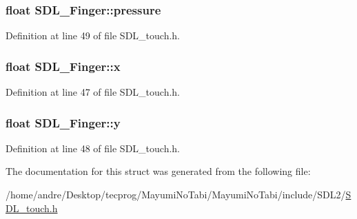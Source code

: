 \hypertarget{struct_s_d_l___finger_a0ecb50c7fd699d59899ac60c941bdee6}{
\subsubsection[{pressure}]{\setlength{\rightskip}{0pt plus 5cm}float S\-D\-L\-\_\-\-Finger\-::pressure}}\label{struct_s_d_l___finger_a0ecb50c7fd699d59899ac60c941bdee6}


Definition at line 49 of file S\-D\-L\-\_\-touch.\-h.

\hypertarget{struct_s_d_l___finger_ab91dfbd03c3215560457fef44e1c7755}{
\subsubsection[{x}]{\setlength{\rightskip}{0pt plus 5cm}float S\-D\-L\-\_\-\-Finger\-::x}}\label{struct_s_d_l___finger_ab91dfbd03c3215560457fef44e1c7755}


Definition at line 47 of file S\-D\-L\-\_\-touch.\-h.

\hypertarget{struct_s_d_l___finger_a0a2c7a06ae641940111e03801c672cf9}{
\subsubsection[{y}]{\setlength{\rightskip}{0pt plus 5cm}float S\-D\-L\-\_\-\-Finger\-::y}}\label{struct_s_d_l___finger_a0a2c7a06ae641940111e03801c672cf9}


Definition at line 48 of file S\-D\-L\-\_\-touch.\-h.



The documentation for this struct was generated from the following file\-:\begin{DoxyCompactItemize}
\item 
/home/andre/\-Desktop/tecprog/\-Mayumi\-No\-Tabi/\-Mayumi\-No\-Tabi/include/\-S\-D\-L2/\hyperlink{_s_d_l__touch_8h}{S\-D\-L\-\_\-touch.\-h}\end{DoxyCompactItemize}
